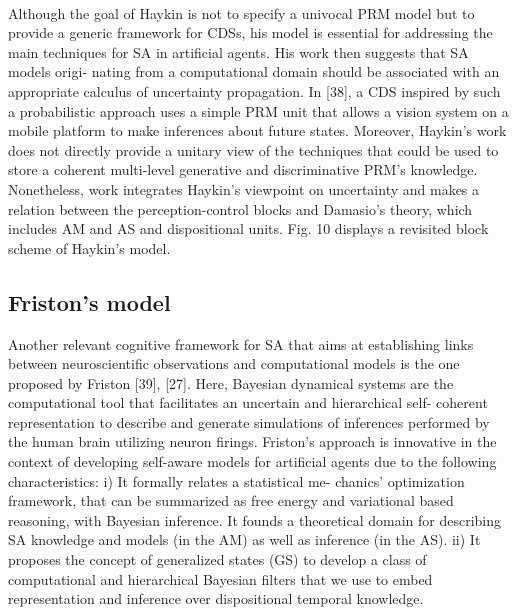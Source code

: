 \documentclass{article}
\begin{document}
		\paragraph{}Although the goal of Haykin is not to specify a univocal
		PRM model but to provide a generic framework for CDSs, his
		model is essential for addressing the main techniques for SA in
		artificial agents. His work then suggests that SA models origi-
		nating from a computational domain should be associated with
		an appropriate calculus of uncertainty propagation. In [38], a
		CDS inspired by such a probabilistic approach uses a simple
		PRM unit that allows a vision system on a mobile platform to
		make inferences about future states. Moreover, Haykin’s work
		does not directly provide a unitary view of the techniques
		that could be used to store a coherent multi-level generative
		and discriminative PRM’s knowledge. Nonetheless, \cite{regazzoni-2020-multi-sensorial-generative-and-descriptive-self-awareness-models-for-autonomous-systems} work
		integrates Haykin’s viewpoint on uncertainty and makes a
		relation between the perception-control blocks and Damasio’s
		theory, which includes AM and AS and dispositional units.
		\cite{regazzoni-2020-multi-sensorial-generative-and-descriptive-self-awareness-models-for-autonomous-systems}Fig. 10 displays a revisited block scheme of Haykin’s model.
		
		\subsection{Friston’s model}
		Another relevant cognitive framework for SA that aims at
		establishing links between neuroscientific observations and
		computational models is the one proposed by Friston [39],
		[27]. Here, Bayesian dynamical systems are the computational
		tool that facilitates an uncertain and hierarchical self-
		coherent representation to describe and generate simulations
		of inferences performed by the human brain utilizing neuron
		firings. Friston’s approach is innovative in the context of
		developing self-aware models for artificial agents due to the
		following characteristics: i) It formally relates a statistical me-
		chanics’ optimization framework, that can be summarized as
		free energy and variational based reasoning, with Bayesian
		inference. It founds a theoretical domain for describing SA
		knowledge and models (in the AM) as well as inference (in
		the AS). ii) It proposes the concept of generalized states (GS)
		to develop a class of computational and hierarchical Bayesian
		filters that we use to embed representation and inference over
		dispositional temporal knowledge.
\end{document}
